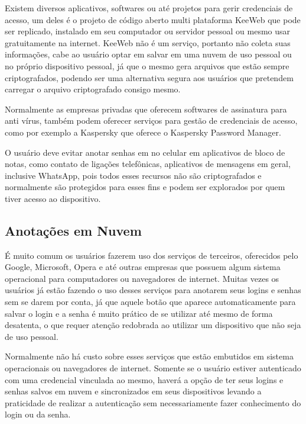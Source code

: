 \documentclass[12pt]{article}
\begin{document}
Existem diversos aplicativos, softwares ou até projetos para gerir
credenciais de acesso, um deles é o projeto de código aberto multi
plataforma KeeWeb que pode ser replicado, instalado em seu computador ou
servidor pessoal ou mesmo usar gratuitamente na internet.
KeeWeb não é um serviço, portanto não coleta suas informações, cabe ao
usuário optar em salvar em uma nuvem de uso pessoal ou no próprio
dispositivo pessoal, já que o mesmo gera arquivos que estão sempre
criptografados, podendo ser uma alternativa segura aos usuários que
pretendem carregar o arquivo criptografado consigo mesmo.

Normalmente as empresas privadas que oferecem softwares de assinatura
para anti vírus, também podem oferecer serviços para gestão de
credenciais de acesso, como por exemplo a Kaspersky que oferece o
Kaspersky Password Manager.


O usuário deve evitar anotar senhas em no celular em aplicativos de
bloco de notas, como contato de ligações telefônicas, aplicativos de
mensagens em geral, inclusive WhatsApp, pois todos esses recursos não são
criptografados e normalmente são protegidos para esses fins e podem ser
explorados por quem tiver acesso ao dispositivo.

\subsection{Anotações em Nuvem}

É muito comum os usuários fazerem uso dos serviços de terceiros,
oferecidos pelo Google, Microsoft, Opera e até outras empresas que
possuem algum sistema operacional para computadores ou navegadores de
internet.
Muitas vezes os usuários já estão fazendo o uso desses serviços para
anotarem seus logins e senhas sem se darem por conta, já que aquele botão
que aparece automaticamente para salvar o login e a senha é muito prático
de se utilizar até mesmo de forma desatenta, o que requer atenção
redobrada ao utilizar um dispositivo que não seja de uso pessoal.

Normalmente não há custo sobre esses serviços que estão embutidos em
sistema operacionais ou navegadores de internet.
Somente se o usuário estiver autenticado com uma credencial vinculada ao
mesmo, haverá a opção de ter seus logins e senhas salvos em nuvem e
sincronizados em seus dispositivos levando a praticidade de realizar a
autenticação sem necessariamente fazer conhecimento do login ou da senha.
\end{document}

